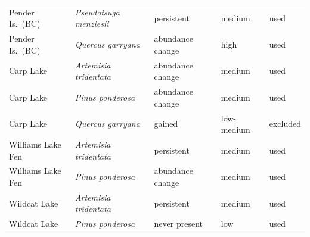 {\begin{longtable}{>{\raggedright\arraybackslash}p{}>{\raggedright\arraybackslash}p{}>{\raggedright\arraybackslash}p{}>{\raggedright\arraybackslash}p{}l}
Pender Is.\ (BC) & \emph{Pseudotsuga menziesii} & persistent & medium & used \\
Pender Is.\ (BC) & \emph{Quercus garryana} & abundance change & high & used \\
Carp Lake & \emph{Artemisia tridentata} & abundance change & medium & used \\
Carp Lake & \emph{Pinus ponderosa} & abundance change & medium & used \\
Carp Lake & \emph{Quercus garryana} & gained & low-medium & excluded \\
Williams Lake Fen & \emph{Artemisia tridentata} & persistent & medium & used \\
Williams Lake Fen & \emph{Pinus ponderosa} & abundance change & medium & used \\
Wildcat Lake & \emph{Artemisia tridentata} & persistent & medium & used \\
Wildcat Lake & \emph{Pinus ponderosa} & never present & low & used \\
\end{longtable}
}
